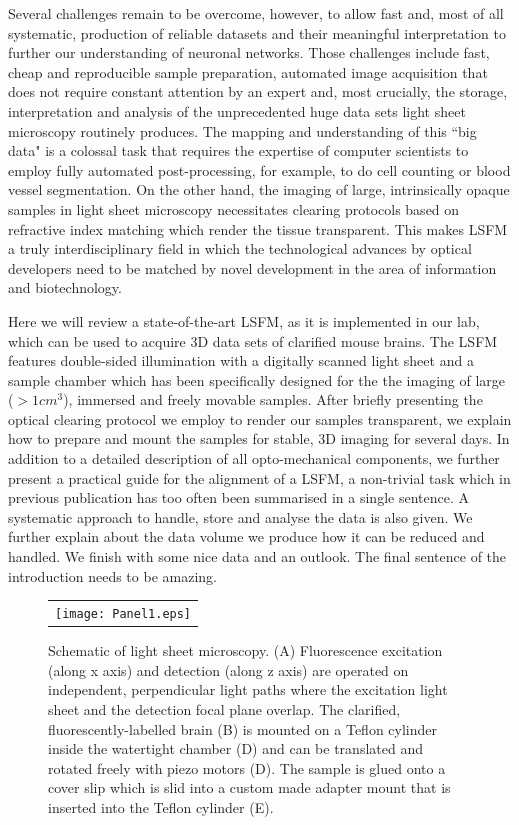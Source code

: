 \documentclass[12pt]{spieman}  %
\begin{document}
Several challenges remain to be overcome, however, to allow fast and, most of all systematic, production of reliable datasets and their meaningful interpretation to further our understanding of neuronal networks. Those challenges include fast, cheap and reproducible sample preparation, automated image acquisition that does not require constant attention by an expert and, most crucially, the storage, interpretation and analysis of the unprecedented huge data sets light sheet microscopy routinely produces. The mapping and understanding of this ``big data" is a colossal task that requires the expertise of computer scientists to employ fully automated post-processing, for example, to do cell counting or blood vessel segmentation. On the other hand, the imaging of large, intrinsically opaque samples in light sheet microscopy necessitates clearing protocols based on refractive index matching which render the tissue transparent. This makes LSFM a truly interdisciplinary field in which the technological advances by optical developers need to be matched by novel development in the area of information and biotechnology.

Here we will review a state-of-the-art LSFM, as it is implemented in our lab, which can be used to acquire 3D data sets of clarified mouse brains. The LSFM features double-sided illumination with a digitally scanned light sheet and a sample chamber which has been specifically designed for the the imaging of large ($> 1cm^3$), immersed and freely movable samples. After briefly presenting the optical clearing protocol we employ to render our samples transparent, we explain how to prepare and mount the samples for stable, 3D imaging for several days. In addition to a detailed description of all opto-mechanical components, we further present a practical guide for the alignment of a LSFM, a non-trivial task which in previous publication has too often been summarised in a single sentence. A systematic approach to handle, store and analyse the data is also given. We further explain about the data volume we produce how it can be reduced and handled. We finish with some nice data and an outlook.  The final sentence of the introduction needs to be amazing. 


\begin{figure}
   \begin{center}
   \begin{tabular}{c}
   \texttt{[image: Panel1.eps]}
   \end{tabular}
   \end{center}
   \caption{\label{fig:Panel1} Schematic of light sheet microscopy. (A) Fluorescence excitation (along x axis) and detection (along z axis) are operated on independent, perpendicular light paths where the excitation light sheet and the detection focal plane overlap. The clarified, fluorescently-labelled brain (B) is mounted on a Teflon cylinder inside the watertight chamber (D) and can be translated and rotated freely with piezo motors (D). The sample is glued onto a cover slip which is slid into a custom made adapter mount that is inserted into the Teflon cylinder (E).} 
   \end{figure}
\end{document}
